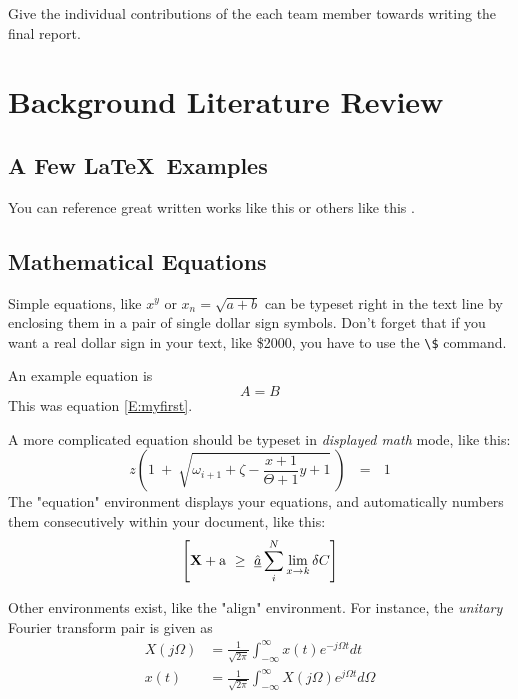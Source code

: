 \documentclass[12pt]{report}
\begin{document}
Give the individual contributions of the each team member towards writing the
final report.


\chapter{Background Literature Review}


\section{A Few \LaTeX\ Examples}

You can reference great written works like this \cite{ABC} or
others like this \cite{XYZ}.


\section {Mathematical Equations}
Simple equations, like $x^y$ or $x_n = \sqrt{a + b}$ can be typeset right
in the text line by enclosing them in a pair of single dollar sign symbols.
Don't forget that if you want a real dollar sign in your text, like \$2000,
you have to use the \verb+\$+ command.

An example equation is
\begin{equation} \label{E:myfirst}
A = B
\end{equation}
This was equation \eqref{E:myfirst}.

A more complicated equation should be typeset in {\em displayed math\/} mode,
like this:
\[
z \left( 1 \ +\ \sqrt{\omega_{i+1} + \zeta -\frac{x+1}{\Theta +1} y + 1} 
\ \right)
\ \ \ =\ \ \ 1
\]
The "equation" environment displays your equations, and automatically
numbers them consecutively within your document, like this:
\begin{equation}
\left[
{\bf X} + {\rm a} \ \geq\ 
\underline{\hat a} \sum_i^N \lim_{x \rightarrow k} \delta C
\right]
\end{equation}


Other environments exist, like the "align" environment.  For instance,
the {\em unitary} Fourier transform pair is given as
\begin{align}
X(j\Omega) &= \frac{1}{\sqrt{2\pi}} \int_{-\infty}^{\infty} x(t) e^{-j\Omega t} dt\\
x(t) &= \frac{1}{\sqrt{2\pi}} \int_{-\infty}^{\infty} X(j\Omega) e^{j\Omega t} d\Omega
\end{align}
\end{document}
